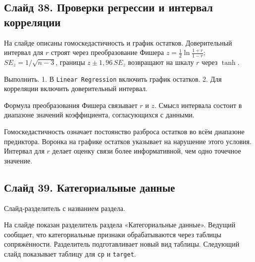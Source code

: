 \documentclass[11pt,a4paper]{article}
\begin{document}
\subsection*{Слайд 38. Проверки регрессии и интервал корреляции}
\begin{onslide}
На слайде описаны гомоскедастичность и график остатков. Доверительный интервал для $r$ строят через преобразование Фишера $z=\frac{1}{2}\ln\frac{1+r}{1-r}$; $SE_z=1/\sqrt{n-3}$, границы $z\pm1{,}96\,SE_z$ возвращают на шкалу $r$ через $\tanh$.
\end{onslide}
\begin{jamovi}
Выполнить. 1. В \texttt{Linear Regression} включить график остатков. 2. Для корреляции включить доверительный интервал.\par Формула преобразования Фишера связывает $r$ и $z$. Смысл интервала состоит в диапазоне значений коэффициента, согласующихся с данными.
\end{jamovi}
Гомоскедастичность означает постоянство разброса остатков во всём диапазоне предиктора. Воронка на графике остатков указывает на нарушение этого условия. Интервал для $r$ делает оценку связи более информативной, чем одно точечное значение.

\subsection*{Слайд 39. Категориальные данные}
\begin{onslide}
Слайд-разделитель с названием раздела.
\end{onslide}
На слайде показан разделитель раздела «Категориальные данные». Ведущий сообщает, что категориальные признаки обрабатываются через таблицы сопряжённости. Разделитель подготавливает новый вид таблицы. Следующий слайд показывает таблицу для \texttt{cp} и \texttt{target}.
\end{document}

